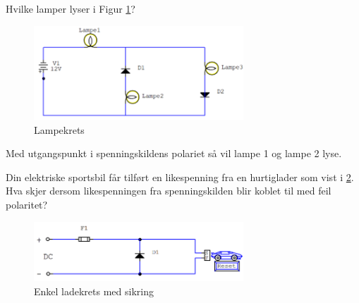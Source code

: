 \vspace{0.5cm} %



\begin{question}[name=Oppgave, topic=dioder]
	Hvilke lamper lyser i Figur \ref{fig:hvilkenLampe}?
	
	\begin{figure}[H]
		\centering
		\includegraphics[width=0.7\textwidth]{diode/figurer/hvalyser.png}
		\caption{Lampekrets}
		\label{fig:hvilkenLampe}
	\end{figure}
	
	
\end{question}

\vspace{0.5cm} %

\begin{solution}[name=Løsningsforslag oppgave]
Med utgangspunkt i spenningskildens polariet så vil lampe 1 og lampe 2 lyse.
	
\end{solution}

\vspace{0.5cm} %


\begin{question}[name=Oppgave, topic=dioder]
Din elektriske sportsbil får tilført en likespenning fra en hurtiglader som vist i \ref{fig:diodeLading}. Hva skjer dersom likespenningen fra spenningskilden blir koblet til med feil polaritet?
	
	\begin{figure}[H]
		\centering
		\includegraphics[width=0.7\textwidth]{diode/figurer/DiodeLading.png}
		\caption{Enkel ladekrets med sikring}
		\label{fig:diodeLading}
	\end{figure}
	
\end{question}

